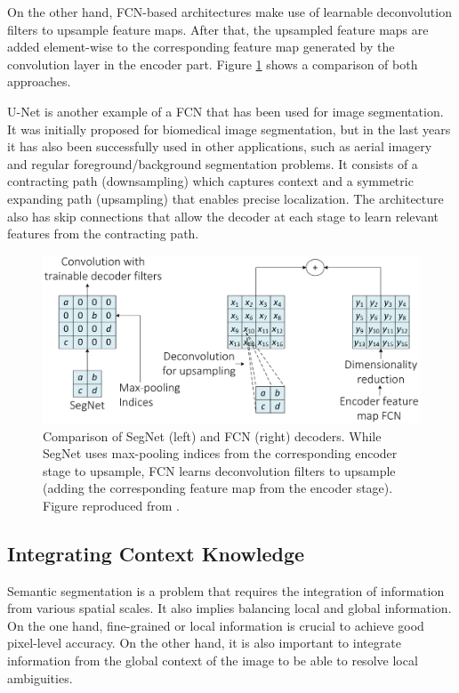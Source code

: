 On the other hand, \acs{FCN}-based architectures make use of learnable deconvolution filters to upsample feature maps. After that, the upsampled feature maps are added element-wise to the corresponding feature map generated by the convolution layer in the encoder part. Figure \ref{fig:semseg:segnetvsfcn} shows a comparison of both approaches.

U-Net \cite{Ronneberger2015} is another example of a \acf{FCN} that has been used for image segmentation. It was initially proposed for biomedical image segmentation, but in the last years it has also been successfully used in other applications, such as aerial imagery \cite{Zhang2017} and regular foreground/background segmentation problems. It consists of a contracting path (downsampling) which captures context and a symmetric expanding path (upsampling) that enables precise localization. The architecture also has skip connections that allow the decoder at each stage to learn relevant features from the contracting path.

\begin{figure}[!hbt]
	\includegraphics[width=\linewidth]{Figures/Segmentation/segnetvsfcn_rework.eps}
	\caption{Comparison of SegNet (left) and \acs{FCN} (right) decoders. While SegNet uses max-pooling indices from the corresponding encoder stage to upsample, \acs{FCN} learns deconvolution filters to upsample (adding the corresponding feature map from the encoder stage). Figure reproduced from \cite{Badrinarayanan2015}.}
	\label{fig:semseg:segnetvsfcn}
\end{figure}

\subsection{Integrating Context Knowledge}

Semantic segmentation is a problem that requires the integration of information from various spatial scales. It also implies balancing local and global information. On the one hand, fine-grained or local information is crucial to achieve good pixel-level accuracy. On the other hand, it is also important to integrate information from the global context of the image to be able to resolve local ambiguities.

